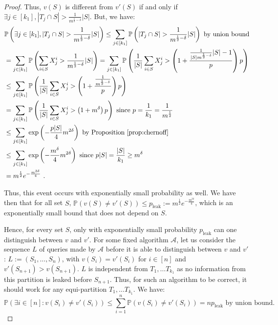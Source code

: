 \begin{proof}
    Thus, $v(S)$ is different from $v'(S)$ if and only if $\exists j \in [k_1], |T_j \cap S| > \frac{1}{m^{\frac{1}{2}-\delta}}|S|$. But, we have:
    \begin{equation}
      \begin{aligned}
        &\mathbb{P}\left(\exists j \in [k_1], |T_j \cap S| > \frac{1}{m^{\frac{1}{2}-\delta}}|S|\right) \leq \sum_{j \in [k_1]} \mathbb{P}\left(|T_j \cap S| > \frac{1}{m^{\frac{1}{2}-\delta}}|S|\right) \text{ by union bound}\\
        &=\sum_{j \in [k_1]} \mathbb{P}\left(\sum_{i \in S}X_j^i > \frac{1}{m^{\frac{1}{2}-\delta}}|S|\right)
        =\sum_{j \in [k_1]} \mathbb{P}\left(\frac{1}{|S|}\sum_{i \in S}X_j^i > \left(1 + \frac{\frac{1}{|S|m^{\frac{1}{2}-\delta}}{|S|}-1}{p}\right)p \right)\\
        &\leq \sum_{j \in [k_1]} \mathbb{P}\left(\frac{1}{|S|}\sum_{i \in S}X_j^i > \left(1 + \frac{\frac{1}{m^{\frac{1}{2}-\delta}}}{p}\right)p \right)\\
        &= \sum_{j \in [k_1]} \mathbb{P}\left(\frac{1}{|S|}\sum_{i \in S}X_j^i > \left(1 + m^{\delta}\right)p \right) \text{ since } p = \frac{1}{k_1} = \frac{1}{m^{\frac{1}{2}}}\\
        &\leq \sum_{j \in [k_1]}\exp\left(-\frac{p|S|}{4}m^{2\delta}\right) \text{ by Proposition~\ref{prop:chernoff}}\\
        &\leq \sum_{j \in [k_1]}\exp\left(-\frac{m^{\delta}}{4}m^{2\delta}\right) \text{ since } p|S| = \frac{|S|}{k_1} \geq m^{\delta}\\
        &= m^{\frac{1}{2}}e^{-\frac{m^{3\delta}}{4}}\ .
      \end{aligned}
    \end{equation}


    Thus, this event occurs with exponentially small probability as well. We have then that for all set $S$,  $\mathbb{P}\left(v(S) \not= v'(S) \right) \leq p_{\text{leak}} := m^{\frac{1}{2}}e^{-\frac{m^{3\delta}}{4}}$, which is an exponentially small bound that does not depend on $S$.

    Hence, for every set $S$, only with exponentially small probability $p_{\text{leak}}$ can one distinguish between $v$ and $v'$. For some fixed algorithm $\mathcal{A}$, let us consider the sequence $L$ of queries made by $\mathcal{A}$ before it is able to distinguish between $v$ and $v'$: $L := (S_1, \ldots, S_n)$, with $v(S_i) = v'(S_i)$ for $i \in [n]$ and $v'(S_{n+1}) > v(S_{n+1})$. $L$ is independent from $T_1, \ldots T_{k_1}$ as no information from this partition is leaked before $S_{n+1}$. Thus, for such an algorithm to be correct, it should work for any equi-partition $T_1, \ldots T_{k_1}$. We have:
    \[ \mathbb{P}\left( \exists i \in [n] : v(S_i) \not= v'(S_i) \right) \leq \sum_{i=1}^n\mathbb{P}\left(v(S_i) \not= v'(S_i) \right) = np_{\text{leak}} \text{ by union bound.}\]


\end{proof}
